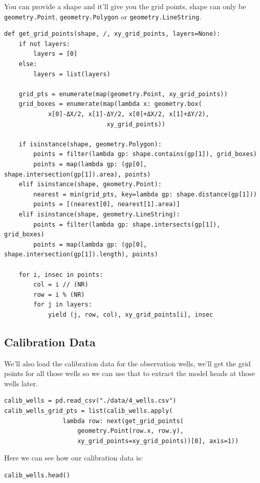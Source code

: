 \documentclass[titlepage,12pt]{unisubmission}
\begin{document}
You can provide a shape and it'll give you the grid points, shape can only be \texttt{geometry.Point}, \texttt{geometry.Polygon} or \texttt{geometry.LineString}.

\begin{verbatim}
def get_grid_points(shape, /, xy_grid_points, layers=None):
    if not layers:
        layers = [0]
    else:
        layers = list(layers)

    grid_pts = enumerate(map(geometry.Point, xy_grid_points))
    grid_boxes = enumerate(map(lambda x: geometry.box(
            x[0]-ΔX/2, x[1]-ΔY/2, x[0]+ΔX/2, x[1]+ΔY/2),
                            xy_grid_points))

    if isinstance(shape, geometry.Polygon):
        points = filter(lambda gp: shape.contains(gp[1]), grid_boxes)
        points = map(lambda gp: (gp[0], shape.intersection(gp[1]).area), points)
    elif isinstance(shape, geometry.Point):
        nearest = min(grid_pts, key=lambda gp: shape.distance(gp[1]))
        points = [(nearest[0], nearest[1].area)]
    elif isinstance(shape, geometry.LineString):
        points = filter(lambda gp: shape.intersects(gp[1]), grid_boxes)
        points = map(lambda gp: (gp[0], shape.intersection(gp[1]).length), points)

    for i, insec in points:
        col = i // (NR)
        row = i % (NR)
        for j in layers:
            yield (j, row, col), xy_grid_points[i], insec
\end{verbatim}


\subsection{Calibration Data}
\label{sec:org2ea384b}
We'll also load the calibration data for the observation wells, we'll get the grid points for all those wells so we can use that to extract the model heads at those wells later.

\begin{verbatim}
calib_wells = pd.read_csv("./data/4_wells.csv")
calib_wells_grid_pts = list(calib_wells.apply(
                lambda row: next(get_grid_points(
                    geometry.Point(row.x, row.y),
                    xy_grid_points=xy_grid_points))[0], axis=1))
\end{verbatim}

Here we can see how our calibration data is:

\begin{verbatim}
calib_wells.head()
\end{verbatim}
\end{document}
